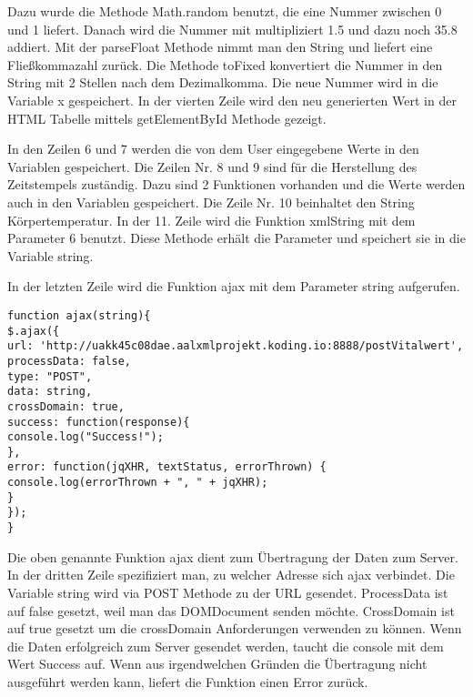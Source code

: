 Dazu wurde die Methode Math.random benutzt, die eine Nummer zwischen 0 und 1 liefert. Danach wird die Nummer mit multipliziert 1.5 und dazu noch 35.8 addiert. Mit der parseFloat Methode nimmt man den String und liefert eine Fließkommazahl zurück.  Die Methode toFixed konvertiert die Nummer in den String mit 2 Stellen nach dem Dezimalkomma. Die neue Nummer wird in die Variable x gespeichert. In der vierten Zeile wird den neu generierten Wert in der HTML Tabelle mittels getElementById Methode gezeigt.

In den Zeilen 6 und 7 werden die von dem User eingegebene Werte in den Variablen gespeichert. Die Zeilen Nr. 8 und 9 sind für die Herstellung des Zeitstempels zuständig. Dazu sind 2 Funktionen vorhanden und die Werte werden auch in den Variablen gespeichert. Die Zeile Nr. 10 beinhaltet den String Körpertemperatur. In der 11. Zeile wird die Funktion xmlString mit dem Parameter 6 benutzt. Diese Methode erhält die Parameter und speichert sie in die Variable string.

In der letzten Zeile wird die Funktion ajax mit dem Parameter string aufgerufen.
\\
\begin{lstlisting}
function ajax(string){
$.ajax({
url: 'http://uakk45c08dae.aalxmlprojekt.koding.io:8888/postVitalwert', 
processData: false,
type: "POST",
data: string,
crossDomain: true,
success: function(response){
console.log("Success!");
},
error: function(jqXHR, textStatus, errorThrown) {
console.log(errorThrown + ", " + jqXHR);
}
});
}
\end{lstlisting}

Die oben genannte Funktion ajax dient zum Übertragung der Daten zum Server. In der dritten Zeile spezifiziert man, zu welcher Adresse sich ajax verbindet. Die Variable string wird via POST Methode zu der URL gesendet. ProcessData ist auf false gesetzt, weil man das DOMDocument senden möchte. CrossDomain ist auf true gesetzt um die crossDomain Anforderungen verwenden zu können. Wenn die Daten erfolgreich zum Server gesendet werden, taucht die console mit dem Wert Success auf. Wenn aus irgendwelchen Gründen die Übertragung nicht ausgeführt werden kann, liefert die Funktion einen Error zurück.   
     
